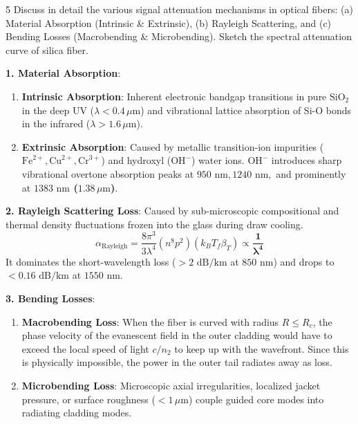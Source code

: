 \begin{theoryq}{5}
Discuss in detail the various signal attenuation mechanisms in optical fibers: (a) Material Absorption (Intrinsic \& Extrinsic), (b) Rayleigh Scattering, and (c) Bending Losses (Macrobending \& Microbending). Sketch the spectral attenuation curve of silica fiber.
\end{theoryq}
\begin{theorysol}
\textbf{1. Material Absorption}:
\begin{enumerate}
    \item \textbf{Intrinsic Absorption}: Inherent electronic bandgap transitions in pure $\text{SiO}_2$ in the deep UV ($\lambda < 0.4\,\mu\text{m}$) and vibrational lattice absorption of Si-O bonds in the infrared ($\lambda > 1.6\,\mu\text{m}$).
    \item \textbf{Extrinsic Absorption}: Caused by metallic transition-ion impurities ($\text{Fe}^{2+}, \text{Cu}^{2+}, \text{Cr}^{3+}$) and hydroxyl ($\text{OH}^-$) water ions. $\text{OH}^-$ introduces sharp vibrational overtone absorption peaks at $950\text{ nm}, 1240\text{ nm},$ and prominently at \textbf{$1383\text{ nm}$ ($1.38\,\mu\text{m}$)}.
\end{enumerate}

\textbf{2. Rayleigh Scattering Loss}:
Caused by sub-microscopic compositional and thermal density fluctuations frozen into the glass during draw cooling.
\begin{equation}
\alpha_{\text{Rayleigh}} = \frac{8\pi^3}{3\lambda^4}(n^8 p^2)(k_B T_f \beta_T) \propto \mathbf{\frac{1}{\lambda^4}}
\end{equation}
It dominates the short-wavelength loss ($> 2\text{ dB/km}$ at $850\text{ nm}$) and drops to $< 0.16\text{ dB/km}$ at $1550\text{ nm}$.

\textbf{3. Bending Losses}:
\begin{enumerate}
    \item \textbf{Macrobending Loss}: When the fiber is curved with radius $R \le R_c$, the phase velocity of the evanescent field in the outer cladding would have to exceed the local speed of light $c/n_2$ to keep up with the wavefront. Since this is physically impossible, the power in the outer tail radiates away as loss.
    \item \textbf{Microbending Loss}: Microscopic axial irregularities, localized jacket pressure, or surface roughness ($< 1\,\mu\text{m}$) couple guided core modes into radiating cladding modes.
\end{enumerate}


\end{theorysol}
